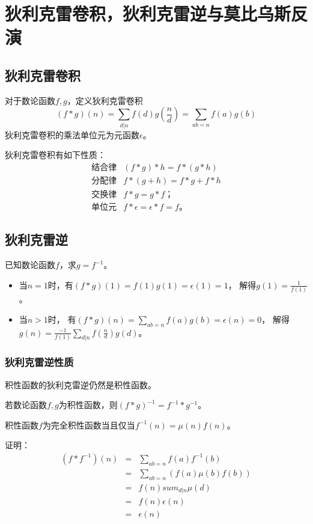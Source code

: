 \section{狄利克雷卷积，狄利克雷逆与莫比乌斯反演}
\subsection{狄利克雷卷积}
对于数论函数$f,g$，定义狄利克雷卷积
\begin{displaymath}
	(f*g)(n)=\sum_{d|n}{f(d)g(\frac{n}{d})}=\sum_{ab=n}{f(a)g(b)}
\end{displaymath}
狄利克雷卷积的乘法单位元为元函数$\epsilon$。

狄利克雷卷积有如下性质：
\begin{eqnarray*}
	\textrm{结合律} & (f*g)*h=f*(g*h)\\
	\textrm{分配律} & f*(g+h)=f*g+f*h\\
	\textrm{交换律} & f*g=g*f；\\
	\textrm{单位元} & f*\epsilon=\epsilon*f=f。
\end{eqnarray*}
\subsection{狄利克雷逆}
已知数论函数$f$，求$g=f^{-1}$。
\begin{itemize}
	\item 当$n=1$时，有$(f*g)(1)=f(1)g(1)=\epsilon(1)=1$，
	      解得$g(1)=\frac{1}{f(1)}$。
	\item 当$n>1$时，
	      有$\displaystyle (f*g)(n)=\sum_{ab=n}{f(a)g(b)}=\epsilon(n)=0$，
	      解得$\displaystyle g(n)=\frac{-1}{f(1)}
		      \sum_{d|n}{f(\frac{n}{d})g(d)}$。
\end{itemize}
\subsubsection{狄利克雷逆性质}
\begin{property}
	积性函数的狄利克雷逆仍然是积性函数。
\end{property}
\begin{property}
	若数论函数$f,g$为积性函数，则$(f*g)^{-1}=f^{-1}*g^{-1}$。
\end{property}
\begin{property}
	积性函数$f$为完全积性函数当且仅当$f^{-1}(n)=\mu(n)f(n)$。
\end{property}
证明：\begin{eqnarray*}
	(f*f^{-1})(n)&=&\sum_{ab=n}{f(a)f^{-1}(b)}\\
	&=&\sum_{ab=n}(f(a)\mu(b)f(b))\\
	&=&f(n)sum_{d|n}{\mu(d)}\\
	&=&f(n)\epsilon(n)\\
	&=&\epsilon(n)
\end{eqnarray*}
